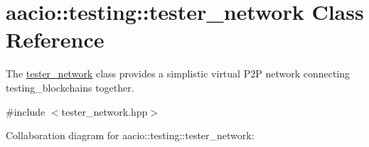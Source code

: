 \hypertarget{classaacio_1_1testing_1_1tester__network}{}\section{aacio\+:\+:testing\+:\+:tester\+\_\+network Class Reference}
\label{classaacio_1_1testing_1_1tester__network}


The \mbox{\hyperlink{classaacio_1_1testing_1_1tester__network}{tester\+\_\+network}} class provides a simplistic virtual P2P network connecting testing\+\_\+blockchains together.  




{\ttfamily \#include $<$tester\+\_\+network.\+hpp$>$}



Collaboration diagram for aacio\+:\+:testing\+:\+:tester\+\_\+network\+:
